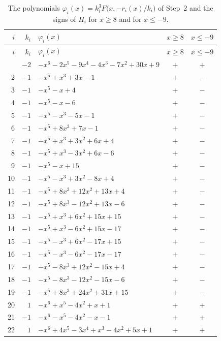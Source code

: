 \documentclass[11pt]{article}
\begin{document}
\begingroup\footnotesize
\setlength{\LTcapwidth}{\textwidth}
\begin{longtable}{@{}rrlcc@{}}
\caption{The polynomials $\varphi_i(x)=k_i^3F\bigl(x,-r_i(x)/k_i\bigr)$ of Step~2 and the signs of $H_i$ for $x\geq8$ and for $x\leq-9$.}\label{tab:phi}\\
\hline $i$ & $k_i$ & $\varphi_i(x)$ & $x\geq8$ & $x\leq-9$\\\hline\endfirsthead\hline $i$ & $k_i$ & $\varphi_i(x)$ & $x\geq8$ & $x\leq-9$\\\hline\endhead\hline\endfoot
0 & $-2$ & $-x^{6}-2x^{5}-9x^{4}-4x^{3}-7x^{2}+30x+9$ & $+$ & $+$\\
2 & $-1$ & $-x^{5}+x^{3}+3x-1$ & $+$ & $-$\\
3 & $-1$ & $-x^{5}-x+4$ & $+$ & $-$\\
4 & $-1$ & $-x^{5}-x-6$ & $+$ & $-$\\
5 & $-1$ & $-x^{5}-x^{3}-5x-1$ & $+$ & $-$\\
6 & $-1$ & $-x^{5}+8x^{3}+7x-1$ & $+$ & $-$\\
7 & $-1$ & $-x^{5}+x^{3}+3x^{2}+6x+4$ & $+$ & $-$\\
8 & $-1$ & $-x^{5}+x^{3}-3x^{2}+6x-6$ & $+$ & $-$\\
9 & $-1$ & $-x^{5}-x+15$ & $+$ & $-$\\
10 & $-1$ & $-x^{5}-x^{3}+3x^{2}-8x+4$ & $+$ & $-$\\
11 & $-1$ & $-x^{5}+8x^{3}+12x^{2}+13x+4$ & $+$ & $-$\\
12 & $-1$ & $-x^{5}+8x^{3}-12x^{2}+13x-6$ & $+$ & $-$\\
13 & $-1$ & $-x^{5}+x^{3}+6x^{2}+15x+15$ & $+$ & $-$\\
14 & $-1$ & $-x^{5}+x^{3}-6x^{2}+15x-17$ & $+$ & $-$\\
15 & $-1$ & $-x^{5}-x^{3}+6x^{2}-17x+15$ & $+$ & $-$\\
16 & $-1$ & $-x^{5}-x^{3}-6x^{2}-17x-17$ & $+$ & $-$\\
17 & $-1$ & $-x^{5}-8x^{3}+12x^{2}-15x+4$ & $+$ & $-$\\
18 & $-1$ & $-x^{5}-8x^{3}-12x^{2}-15x-6$ & $+$ & $-$\\
19 & $-1$ & $-x^{5}+8x^{3}+24x^{2}+31x+15$ & $+$ & $-$\\
20 & $1$ & $-x^{6}+x^{5}-4x^{2}+x+1$ & $+$ & $+$\\
21 & $-1$ & $-x^{6}-x^{5}-4x^{2}-x-1$ & $+$ & $+$\\
22 & $1$ & $-x^{6}+4x^{5}-3x^{4}+x^{3}-4x^{2}+5x+1$ & $+$ & $+$\\

\end{longtable}
\end{document}
